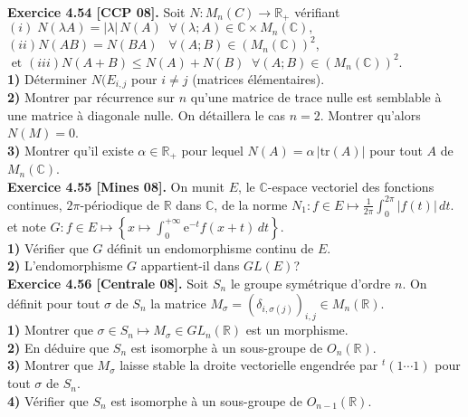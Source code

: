 \documentclass[a4paper,12pt,francais]{article}
\newcommand{\field}[1]{\mathbb{#1}}
\newcommand{\R}{\field{R}}
\newcommand{\C}{\field{C}}
\newcommand{\e}{\mbox{e}}
\newcommand{\tr}{\mbox{tr}}
\begin{document}
\noindent
{\bf Exercice 4.54 [CCP 08].} Soit $N : M_n(C)\to \R_+$ vérifiant \\
\indent $(i) \; N(\lambda A)=|\lambda|\, N(A) \; \; \forall (\lambda;A) \in \C \times M_n(\C),$\\
\indent $(ii) N(AB)=N(BA) \; \; \; \forall (A;B) \in (M_n(\C))^2$,\\
\indent $\mbox{ et } (iii) N(A+B)\leqslant N(A)+N(B) \; \; \forall (A;B) \in (M_n(\C))^2.$\\ 
{\bf 1)} Déterminer $N(E_{i,j}$ pour $i\neq j$ (matrices élémentaires).\\
{\bf 2)} Montrer par récurrence sur $n$ qu'une matrice de trace nulle est semblable à une matrice à diagonale nulle. On détaillera le cas $n=2$. Montrer qu'alors $N(M)=0$.\\
{\bf 3)} Montrer qu'il existe $\alpha \in \R_+$ pour lequel $N(A)=\alpha \, |\tr (A)|$ pour tout $A$ de $M_n(\C)$.\\

\noindent
{\bf Exercice 4.55 [Mines 08].} On munit $E$, le $\C$-espace vectoriel des fonctions continues, $2\pi$-périodique de $\R$ dans $\C$, de la norme $\displaystyle N_1:f\in E \mapsto \frac{1}{2\pi} \int_0^{2\pi} |f(t)|\, dt$. 
et note $\displaystyle G : f \in E \mapsto \left\{ { x \mapsto \int_0^{+\infty} \e^{-t} f(x+t)\, dt }\right\}.$\\
\indent
{\bf 1)} Vérifier que $G$ définit un endomorphisme continu de $E$.\\
\indent
{\bf 2)} L'endomorphisme $G$ appartient-il dans $GL(E)$?\\

\noindent
{\bf Exercice 4.56 [Centrale 08].} Soit $S_n$ le groupe symétrique d'ordre $n$. On définit pour tout $\sigma $ de $S_n$ la matrice $M_\sigma=(\delta_{i,\sigma(j)})_{i,j}\in M_n(\R)$.\\
\indent
{\bf 1)} Montrer que $\sigma \in S_n \mapsto M_\sigma \in GL_n(\R)$ est un morphisme.\\
\indent
{\bf 2)} En déduire que $S_n$ est isomorphe à un sous-groupe de $O_n(\R)$.\\
\indent
{\bf 3)} Montrer que $M_\sigma$ laisse stable la droite vectorielle engendrée par $^t(1 \cdots 1) $ pour tout $\sigma$ de $S_n$.\\
\indent
{\bf 4)} Vérifier que $S_n$ est isomorphe à un sous-groupe de $O_{n-1}(\R)$.\\
\end{document}
